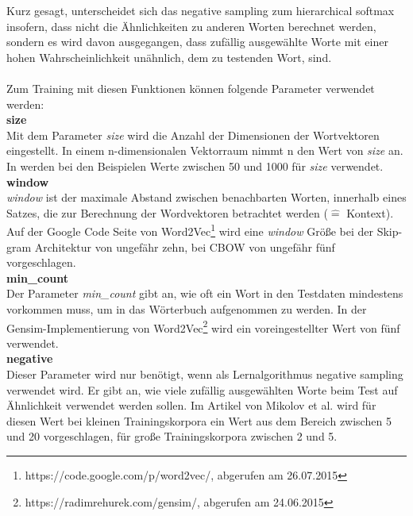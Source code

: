 \documentclass[12pt,a4paper]{report}
\begin{document}
Kurz gesagt, unterscheidet sich das negative sampling zum hierarchical softmax insofern, dass nicht die Ähnlichkeiten zu anderen Worten berechnet werden, sondern es wird davon ausgegangen, dass zufällig ausgewählte Worte mit einer hohen Wahrscheinlichkeit unähnlich, dem zu testenden Wort, sind.\\
	\vspace{1em}\\
Zum Training mit diesen Funktionen können folgende Parameter verwendet werden:\\

\textbf{size}
	\vspace{1em}\\
	Mit dem Parameter \textit{size} wird die Anzahl der Dimensionen der Wortvektoren eingestellt. In einem n-dimensionalen Vektorraum nimmt n den Wert von \textit{size} an. In \citep{DBLP:journals/corr/abs-1301-3781} werden bei den Beispielen Werte zwischen 50 und 1000 für \textit{size} verwendet.\\	
	
	\textbf{window}
	\vspace{1em}\\
	\textit{window} ist der maximale Abstand zwischen benachbarten Worten, innerhalb eines Satzes, die zur Berechnung der Wordvektoren betrachtet werden ($\widehat{=}$ Kontext). Auf der Google Code Seite von Word2Vec\footnote{https://code.google.com/p/word2vec/, abgerufen am 26.07.2015} wird eine \textit{window} Größe bei der Skip-gram Architektur von ungefähr zehn, bei CBOW von ungefähr fünf vorgeschlagen.\\
	
	\textbf{min\_count}
	\vspace{1em}\\
	Der Parameter \textit{min\_count} gibt an, wie oft ein Wort in den Testdaten mindestens vorkommen muss, um in das Wörterbuch aufgenommen zu werden. In der Gensim-Implementierung von Word2Vec\footnote{https://radimrehurek.com/gensim/, abgerufen am 24.06.2015} wird ein voreingestellter Wert von fünf verwendet.\\
	
	\textbf{negative}
	\vspace{1em}\\
	Dieser Parameter wird nur benötigt, wenn als Lernalgorithmus negative sampling verwendet wird. Er gibt an, wie viele zufällig ausgewählten Worte beim Test auf Ähnlichkeit verwendet werden sollen. Im Artikel von Mikolov et al. \citep{DBLP:journals/corr/MikolovSCCD13} wird für diesen Wert bei kleinen Trainingskorpora ein Wert aus dem Bereich zwischen 5 und 20 vorgeschlagen, für große Trainingskorpora zwischen 2 und 5.\\
\end{document}
